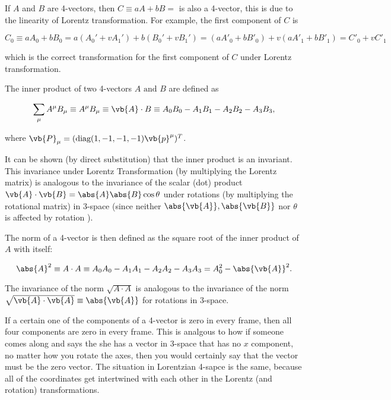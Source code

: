 \documentclass[english,a4paper,12pt]{report}
\begin{document}
If \(A\) and \(B\) are 4-vectors, then \(C \equiv aA + bB = \) is also a 4-vector, this is due to the linearity of Lorentz transformation. For example, the first component of \(C\) is

\begin{equation}
    C_0 \equiv aA_0 + bB_0  = a(A_0 ' + v A_1 ') + b(B_0 ' + vB_1 ') = (aA'_{0} + b B'_{0}) + v(aA'_{1} + bB'_{1}  ) = C'_{0} + vC'_{1}  
\end{equation}

which is the correct transformation for the first component of \(C\) under Lorentz transformation.

The inner product of two 4-vectors \(A \text { and } B\) are defined as 

\begin{equation}
    \sum_{\mu} A ^{\mu }B _{\mu } \equiv A ^{\mu } B _{\mu}  \equiv  \vb{A}  \cdot B  \equiv A_0 B_0 - A_1 B_1  - A_2 B_2 - A_3 B_3,
\end{equation}

where \(\vb{P} _{\mu } = (\text{diag}(1,-1,-1,-1) \vb{p} ^{\mu }  )^T \).  

It can be shown (by direct substitution) that the inner product is an invariant. This invariance under Lorentz Transformation (by multiplying the Lorentz matrix) is analogous to the invariance of the scalar (dot) product \(\vb{A} \cdot \vb{B} = \abs{A}\abs{B}\cos \theta   \) under rotations (by multiplying the rotational matrix) in 3-space (since neither \(\abs{\vb{A} }, \abs{\vb{B} }   \) nor \(\theta \) is affected by rotation ). 

The norm of a 4-vector is then defined as the square root of the inner product of \(A\) with itself:

\begin{equation}
    \abs{A}^2 \equiv A \cdot A \equiv A_0 A_0 - A_1 A_1 -A_2 A_2 -A_3 A_3  = A_0 ^2 - \abs{\vb{A} }^2.  
\end{equation}

The invariance of the norm \(\sqrt{A \cdot A} \) is analogous to the invariance of the norm \(\sqrt{\vb{A} \cdot \vb{A} } \equiv \abs{\vb{A} } \) for rotations in 3-space. 

If a certain one of the components of a 4-vector is zero in every frame, then all four components are zero in every frame. This is analgous to how if someone comes along and says the she has a vector in 3-space that has no \(x\) component, no matter how you rotate the axes, then you would certainly say that the vector must be the zero vector. The situation in Lorentzian 4-sapce is the same, because all of the coordinates get intertwined with each other in the Lorentz (and rotation) transformations.
\end{document}
